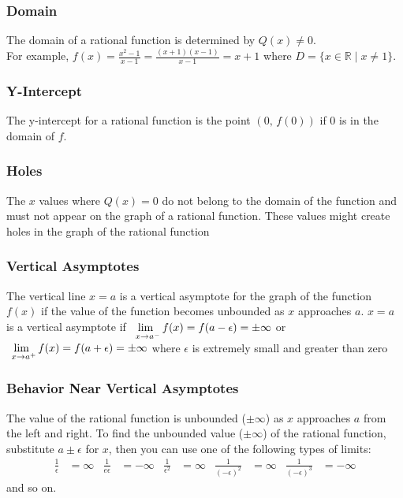 \documentclass{article}
\begin{document}
	\subsubsection{Domain}
	The domain of a rational function is determined by $Q(x)\neq0$.\\
	For example, $f(x)=\frac{x^2-1}{x-1}=\frac{(x+1)(x-1)}{x-1}=x+1$ where $D=\{x\in\mathbb{R}\mid x\neq1\}$.
	\subsubsection{Y-Intercept}
	The y-intercept for a rational function is the point $(0,\,f(0))$ if 0 is in the domain of $f$.
	\subsubsection{Holes}
	The $x$ values where $Q(x)=0$ do not belong to the domain of the function and must not appear on the graph of a rational function. These values might create holes in the graph of the rational function
	\subsubsection{Vertical Asymptotes}
	The vertical line $x=a$ is a vertical asymptote for the graph of the function $f(x)$ if the value of the function becomes unbounded as $x$ approaches $a$. $x=a$ is a vertical asymptote if $\lim\limits_{\hspace{1ex}x\to a^-}f(x)=f(a-\epsilon)=\pm\infty$ or $\lim\limits_{\hspace{1ex}x\to a^+}f(x)=f(a+\epsilon)=\pm\infty$ where $\epsilon$ is extremely small and greater than zero
	\subsubsection{Behavior Near Vertical Asymptotes}
	The value of the rational function is unbounded ($\pm\infty$) as $x$ approaches $a$ from the left and right. To find the unbounded value ($\pm\infty$) of the rational function, substitute $a\pm\epsilon$ for $x$, then you can use one of the following types of limits:
	\begin{align*}
		\frac{1}{\epsilon}&=\infty&\frac{1}{e\epsilon}&=-\infty&\frac{1}{\epsilon^2}&=\infty&\frac{1}{(-\epsilon)^2}&=\infty&\frac{1}{(-\epsilon)^3}&=-\infty
	\end{align*}
	and so on.
\end{document}
